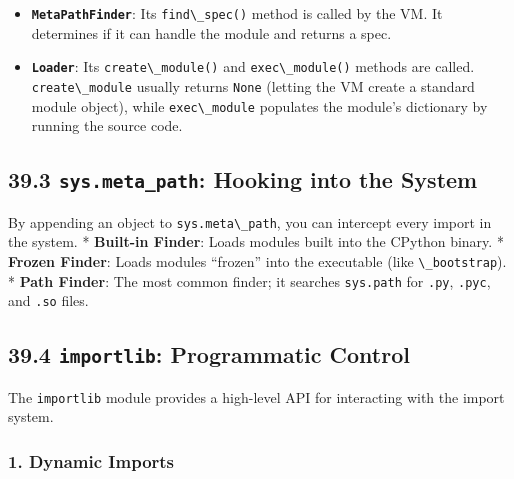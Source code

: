 \begin{itemize}
\tightlist
\item
  \textbf{\passthrough{\lstinline!MetaPathFinder!}}: Its
  \passthrough{\lstinline!find\_spec()!} method is called by the VM. It
  determines if it can handle the module and returns a spec.
\item
  \textbf{\passthrough{\lstinline!Loader!}}: Its
  \passthrough{\lstinline!create\_module()!} and
  \passthrough{\lstinline!exec\_module()!} methods are called.
  \passthrough{\lstinline!create\_module!} usually returns
  \passthrough{\lstinline!None!} (letting the VM create a standard
  module object), while \passthrough{\lstinline!exec\_module!} populates
  the module's dictionary by running the source code.
\end{itemize}

\hypertarget{sys.meta_path-hooking-into-the-system}{%
\subsection{\texorpdfstring{39.3 \texttt{sys.meta\_path}: Hooking into
the
System}{39.3 sys.meta\_path: Hooking into the System}}\label{sys.meta_path-hooking-into-the-system}}

By appending an object to \passthrough{\lstinline!sys.meta\_path!}, you
can intercept every import in the system. * \textbf{Built-in Finder}:
Loads modules built into the CPython binary. * \textbf{Frozen Finder}:
Loads modules ``frozen'' into the executable (like
\passthrough{\lstinline!\_bootstrap!}). * \textbf{Path Finder}: The most
common finder; it searches \passthrough{\lstinline!sys.path!} for
\passthrough{\lstinline!.py!}, \passthrough{\lstinline!.pyc!}, and
\passthrough{\lstinline!.so!} files.

\hypertarget{importlib-programmatic-control}{%
\subsection{\texorpdfstring{39.4 \texttt{importlib}: Programmatic
Control}{39.4 importlib: Programmatic Control}}\label{importlib-programmatic-control}}

The \passthrough{\lstinline!importlib!} module provides a high-level API
for interacting with the import system.

\hypertarget{dynamic-imports}{%
\subsubsection{1. Dynamic Imports}\label{dynamic-imports}}

